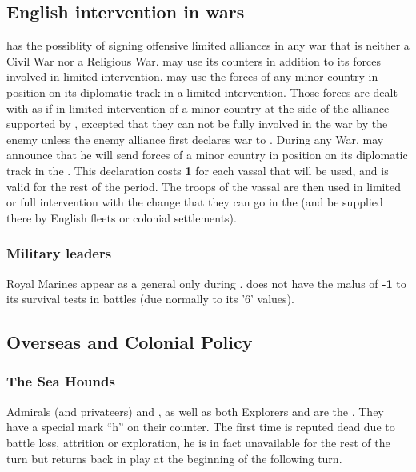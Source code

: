 \label{chSpecific:England}
\subsection{English intervention in wars}
\aparag \ENG has the possiblity of signing offensive limited alliances in any
war that is neither a Civil War nor a Religious War.
\aparag \ENG may use its \corsaire counters in addition to its forces
involved in limited intervention.
\aparag\label{chSpecific:England:Minors at war} \ENG may use the forces of any
minor country in \VASSAL position on its diplomatic track in a limited
intervention. Those forces are dealt with as if in limited intervention
of a minor country at the side of the alliance supported by \ENG,
excepted that they can not be fully involved in the war by the enemy
unless the enemy alliance first declares war to \ENG.
\aparag During any War, \ENG may announce that he will send forces of a
minor country in \VASSAL position on its diplomatic track in the
\ROTW. This declaration costs {\bf 1} \STAB for each vassal that will be
used, and is valid for the rest of the period. The troops of the vassal
are then used in limited or full intervention with the change that they
can go in the \ROTW (and be supplied there by English fleets or colonial
settlements).
\subsubsection{Military leaders}
\aparag\label{rule:RoyalMarines} Royal Marines appear as a general only
during .
\aparag {} does not have the malus of {\bf -1} to its
survival tests in battles (due normally to its '6' values).

\subsection{Overseas and Colonial Policy}
\subsubsection{The Sea Hounds}\label{chSpecific:England:Sea Hounds}
\aparag Admirals (and privateers)  and ,
as well as both Explorers  and  are
the . They have a special mark ``h'' on their counter.
\bparag[Drake] The first time  is reputed dead due to
battle loss, attrition or exploration, he is in fact unavailable for the
rest of the turn but returns back in play at the beginning of the
following turn.

